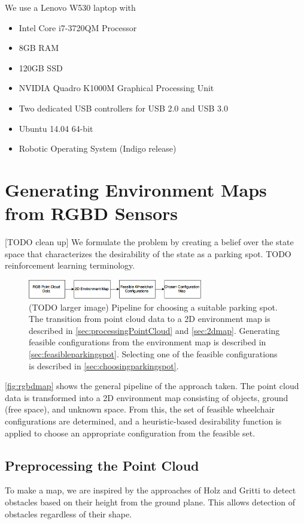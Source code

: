 We use a Lenovo W530 laptop with 
\begin{itemize}
\item Intel Core i7-3720QM Processor
\item 8GB RAM
\item 120GB SSD
\item NVIDIA Quadro K1000M Graphical Processing Unit
\item Two dedicated USB controllers for USB 2.0 and USB 3.0
\item Ubuntu 14.04 64-bit
\item Robotic Operating System (Indigo release)
\end{itemize}


\section{Generating Environment Maps from RGBD Sensors}

[TODO clean up]
We formulate the problem by creating a belief over the state space
that characterizes the desirability of the state as a parking spot.
TODO reinforcement learning terminology.

\begin{figure}
\centering
\includegraphics[width=3in]{figures/rgbdmap.png}
\caption{(TODO larger image) Pipeline for choosing a suitable parking spot.
The transition from point cloud data to a 2D environment map is described in
\autoref{sec:processingPointCloud} and \autoref{sec:2dmap}. Generating feasible configurations from the
environment map is described in \autoref{sec:feasibleparkingspot}. Selecting one
of the feasible configurations is described in
\autoref{sec:choosingparkingspot}.}
\label{fig:rgbdmap}
\end{figure}

\autoref{fig:rgbdmap} shows the general pipeline of the approach taken. The
point cloud data is transformed into a 2D environment map consisting of objects,
ground (free space), and unknown space. From this, the set of feasible
wheelchair configurations are determined, and a heuristic-based desirability
function is applied to choose an appropriate configuration from the feasible set.





\subsection{Preprocessing the Point Cloud}
\label{sec:processingPointCloud}
To make a map, we are inspired by the approaches of Holz \cite{holz2013towards}
and Gritti \cite{gritti2014kinect} to detect obstacles based on their height
from the ground plane. This allows detection of obstacles regardless of
their shape.

